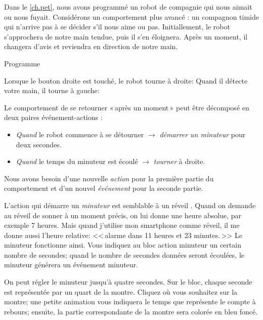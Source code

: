 \label{ch.time}

Dans le \cref{ch.pet}, nous avons programmé un robot de compagnie qui nous aimait ou nous fuyait.
Considérons un comportement plus avancé : un compagnon timide qui n'arrive pas à se décider s'il nous aime ou pas.
Initiallement, le robot s'approchera de notre main tendue, puis il s'en éloignera.
Après un moment, il changera d'avis et reviendra en direction de notre main.

{\raggedleft \hfill Programme }

Lorsque le bouton droite est touché, le robot tourne à droite:
Quand il détecte votre main, il tourne à gauche:  

Le comportement de se retourner «\,après un moment\,» peut être décomposé en deux paires événement-actions :
\begin{itemize}

\item \emph{Quand} le robot commence à se détourner $\rightarrow$ \emph{démarrer un minuteur} pour deux secondes.

\item \emph{Quand} le temps du minuteur est écoulé $\rightarrow$ \emph{tourner} à droite.

\end{itemize}

Nous avons besoin d'une nouvelle \emph{action} pour la première partie du comportement et d'un nouvel \emph{événement} pour la seconde partie.

L'action qui démarre un \emph{minuteur}
est semblable à un réveil .
Quand on demande au réveil de sonner à un moment précis,
on lui donne une heure absolue, par exemple 7 heures.
Mais quand j'utilise mon smartphone comme réveil,
il me donne aussi l'heure relative: <<\,alarme dans 11 heures et 23 minutes.\,>>
Le minuteur fonctionne ainsi.
Vous indiquez au bloc action minuteur un certain nombre de secondes; quand le nombre de secondes données seront écoulées,
le minuteur générera un événement minuteur.

On peut régler le minuteur jusqu'à quatre secondes.
Sur le bloc, chaque seconde est représentée par un quart de la montre.
Cliquez où vous souhaitez sur la montre;
une petite animation vous indiquera le temps que représente le compte à rebours;
ensuite, la partie correspondante de la montre sera colorée en bleu foncé.

